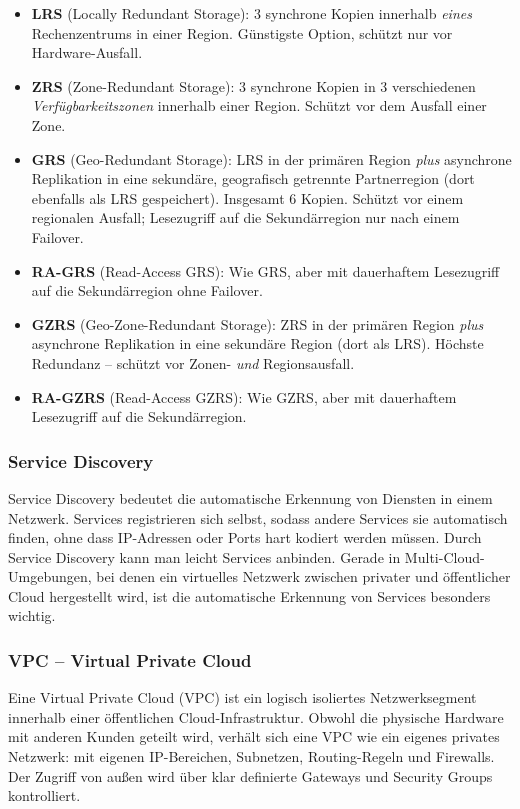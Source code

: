 \begin{itemize}
    \item \textbf{LRS} (Locally Redundant Storage): 3 synchrone Kopien innerhalb \emph{eines} Rechenzentrums in einer Region. Günstigste Option, schützt nur vor Hardware-Ausfall.
    \item \textbf{ZRS} (Zone-Redundant Storage): 3 synchrone Kopien in 3 verschiedenen \emph{Verfügbarkeitszonen} innerhalb einer Region. Schützt vor dem Ausfall einer Zone.
    \item \textbf{GRS} (Geo-Redundant Storage): LRS in der primären Region \emph{plus} asynchrone Replikation in eine sekundäre, geografisch getrennte Partnerregion (dort ebenfalls als LRS gespeichert). Insgesamt 6 Kopien. Schützt vor einem regionalen Ausfall; Lesezugriff auf die Sekundärregion nur nach einem Failover.
    \item \textbf{RA-GRS} (Read-Access GRS): Wie GRS, aber mit dauerhaftem Lesezugriff auf die Sekundärregion ohne Failover.
    \item \textbf{GZRS} (Geo-Zone-Redundant Storage): ZRS in der primären Region \emph{plus} asynchrone Replikation in eine sekundäre Region (dort als LRS). Höchste Redundanz -- schützt vor Zonen- \emph{und} Regionsausfall.
    \item \textbf{RA-GZRS} (Read-Access GZRS): Wie GZRS, aber mit dauerhaftem Lesezugriff auf die Sekundärregion.
\end{itemize}

\subsubsection{Service Discovery}
Service Discovery bedeutet die automatische Erkennung von Diensten in einem Netzwerk. Services registrieren sich selbst, sodass andere Services sie automatisch finden, ohne dass IP-Adressen oder Ports hart kodiert werden müssen. Durch Service Discovery kann man leicht Services anbinden. Gerade in Multi-Cloud-Umgebungen, bei denen ein virtuelles Netzwerk zwischen privater und öffentlicher Cloud hergestellt wird, ist die automatische Erkennung von Services besonders wichtig.

\subsubsection{VPC – Virtual Private Cloud}
Eine Virtual Private Cloud (VPC) ist ein logisch isoliertes Netzwerksegment
innerhalb einer öffentlichen Cloud-Infrastruktur. Obwohl die physische Hardware
mit anderen Kunden geteilt wird, verhält sich eine VPC wie ein eigenes privates
Netzwerk: mit eigenen IP-Bereichen, Subnetzen, Routing-Regeln und Firewalls.
Der Zugriff von außen wird über klar definierte Gateways und Security Groups
kontrolliert.

